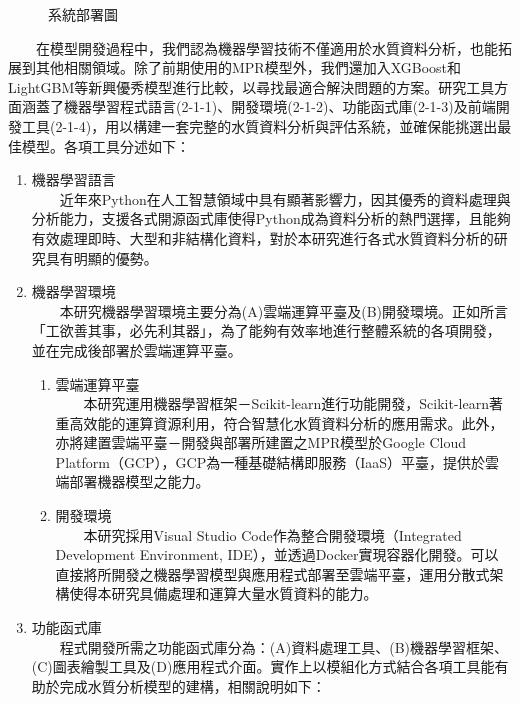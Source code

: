 \documentclass[12pt,a4paper]{article}
\begin{document}
\begin{enumerate}
\begin{enumerate}[label=\arabic*.]
\begin{figure}[H]
\begin{minipage}[t]{0.4\textwidth}
            \caption{系統部署圖}
            \label{fig:deployment_diagram}
        \end{minipage}
    \end{figure}
　　在模型開發過程中，我們認為機器學習技術不僅適用於水質資料分析，也能拓展到其他相關領域。除了前期使用的MPR模型外，我們還加入XGBoost和LightGBM等新興優秀模型進行比較，以尋找最適合解決問題的方案。研究工具方面涵蓋了機器學習程式語言(2-1-1)、開發環境(2-1-2)、功能函式庫(2-1-3)及前端開發工具(2-1-4)，用以構建一套完整的水質資料分析與評估系統，並確保能挑選出最佳模型。各項工具分述如下：
    \begin{enumerate}[label=2-1-\arabic*.]
        \item 機器學習語言\\
        　　近年來Python在人工智慧領域中具有顯著影響力，因其優秀的資料處理與分析能力，支援各式開源函式庫使得Python成為資料分析的熱門選擇\cite{ref12}，且能夠有效處理即時、大型和非結構化資料\cite{ref13}，對於本研究進行各式水質資料分析的研究具有明顯的優勢。
        \item 機器學習環境\\
        　　本研究機器學習環境主要分為(A)雲端運算平臺及(B)開發環境。正如所言「工欲善其事，必先利其器」，為了能夠有效率地進行整體系統的各項開發，並在完成後部署於雲端運算平臺。 
                    \begin{enumerate}[label=\Alph*.]
                        \item 雲端運算平臺\\
                        　　本研究運用機器學習框架－Scikit-learn進行功能開發，Scikit-learn著重高效能的運算資源利用，符合智慧化水質資料分析的應用需求。此外，亦將建置雲端平臺－開發與部署所建置之MPR模型於Google Cloud Platform（GCP），GCP為一種基礎結構即服務（IaaS）平臺，提供於雲端部署機器模型之能力。 
                        \item 開發環境\\
                        　　本研究採用Visual Studio Code作為整合開發環境（Integrated Development Environment, IDE），並透過Docker實現容器化開發。可以直接將所開發之機器學習模型與應用程式部署至雲端平臺，運用分散式架構使得本研究具備處理和運算大量水質資料的能力。
                    \end{enumerate}
        \item 功能函式庫\\
        　　程式開發所需之功能函式庫分為：(A)資料處理工具、(B)機器學習框架、(C)圖表繪製工具及(D)應用程式介面。實作上以模組化方式結合各項工具能有助於完成水質分析模型的建構，相關說明如下：
            \begin{enumerate}[label=\Alph*.]

\end{enumerate}
\end{enumerate}
\end{enumerate}
\end{enumerate}
\end{document}
